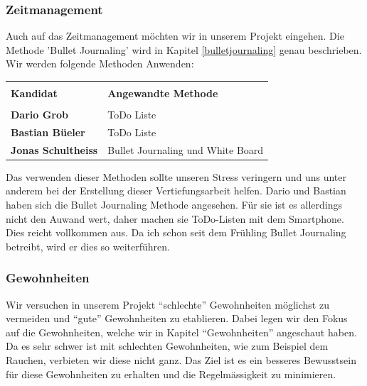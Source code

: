 \subsubsection{Zeitmanagement}
Auch auf das Zeitmanagement möchten wir in unserem Projekt eingehen. Die Methode 'Bullet Journaling' wird in Kapitel \ref{bulletjournaling} genau beschrieben. Wir werden folgende Methoden Anwenden:
\newline
\begin{table}[htp]
  \begin{tabularx}{\textwidth}{l X}\hline \\
    \textbf{Kandidat} & \textbf{Angewandte Methode}  \\\hline \\
    \textbf{Dario Grob} & ToDo Liste \\
    \textbf{Bastian Büeler} & ToDo Liste \\
    \textbf{Jonas Schultheiss} & Bullet Journaling und White Board
    \\\hline
  \end{tabularx}
\end{table}
\newline
Das verwenden dieser Methoden sollte unseren Stress veringern und uns unter anderem bei der Erstellung dieser Vertiefungsarbeit helfen. Dario und Bastian haben sich die Bullet Journaling Methode angesehen. Für sie ist es allerdings nicht den Auwand wert, daher machen sie ToDo-Listen mit dem Smartphone. Dies reicht vollkommen aus. Da ich schon seit dem Frühling Bullet Journaling betreibt, wird er dies so weiterführen.
\subsubsection{Gewohnheiten}
Wir versuchen in unserem Projekt “schlechte” Gewohnheiten möglichst zu vermeiden und “gute” Gewohnheiten zu etablieren. Dabei legen wir den Fokus auf die Gewohnheiten, welche wir in Kapitel “Gewohnheiten” angeschaut haben.
\newline
Da es sehr schwer ist mit schlechten Gewohnheiten, wie zum Beispiel dem Rauchen, verbieten wir diese nicht ganz. Das Ziel ist es ein besseres Bewusstsein für diese Gewohnheiten zu erhalten und die Regelmässigkeit zu minimieren.
